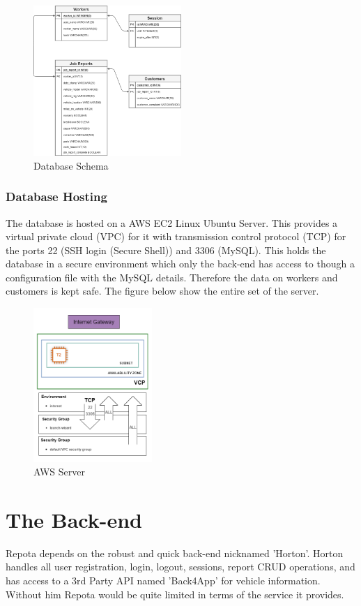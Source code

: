 \begin{figure}[H]
    \caption{Database Schema}
    \label{image:db}
    \centering
    \includegraphics[width=0.5\textwidth]{images/database/database.png}
\end{figure}

\subsubsection{Database Hosting}
The database is hosted on a AWS EC2 Linux Ubuntu Server. This provides a virtual private cloud (VPC) for it with transmission control protocol (TCP) for the ports 22 (SSH login (Secure Shell)) and 3306 (MySQL). This holds the database in a secure environment which only the back-end has access to though a configuration file with the MySQL details. Therefore the data on workers and customers is kept safe. The figure below show the entire set of the server.

\begin{figure}[H]
    \caption{AWS Server}
    \label{image:db_aws}
    \centering
    \includegraphics[width=0.4\textwidth]{images/aws/aws_linux.png}
\end{figure}

\section{The Back-end}
Repota depends on the robust and quick back-end nicknamed 'Horton'. 
Horton handles all user registration, login, logout, sessions, report CRUD operations, and has access to a 3rd Party API named 'Back4App' for vehicle information. Without him Repota would be quite limited in terms of the service it provides. 


